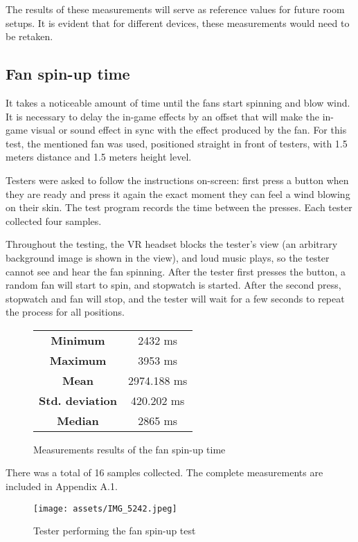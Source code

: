 The results of these measurements will serve as reference values for future
room setups. It is evident that for different devices, these measurements
would need to be retaken.


\hypertarget{x-fan-spin-up-time}{\subsection{Fan spin-up time}}
It takes a noticeable amount of time until the fans start spinning and
blow wind. It is necessary to delay the in-game effects by an offset that
will make the in-game visual or sound effect in sync with the effect
produced by the fan.
For this test, the mentioned fan was used, positioned straight in front of
testers, with 1.5 meters distance and 1.5 meters height level.


Testers were asked to follow the instructions on-screen: first press a button
when they are ready and press it again the exact moment they can feel a wind
blowing on their skin. The test program records the time between the presses.
Each tester collected four samples.

Throughout the testing, the VR headset blocks the tester’s view (an arbitrary
background image is shown in the view), and loud music plays, so the tester
cannot see and hear the fan spinning. After the tester first presses the button,
a random fan will start to spin, and stopwatch is started. After the second
press, stopwatch and fan will stop, and the tester will wait for a few seconds
to repeat the process for all positions.

\begin{figure}[H]
\centering
\begin{tabular}{|c|c|}
\hline
\textbf{Minimum} & 2432 ms \\ 
\textbf{Maximum} & 3953 ms \\ 
\textbf{Mean} & 2974.188 ms \\ 
\textbf{Std. deviation} & 420.202 ms \\ 
\textbf{Median} & 2865 ms \\ 
\hline
\end{tabular}
\caption{Measurements results of the fan spin-up time}
\end{figure}

There was a total of 16 samples collected. The complete measurements are included 
in Appendix A.1.

\begin{figure}[h]{}
\centering\texttt{[image: assets/IMG\_5242.jpeg]}
\caption{Tester performing the fan spin-up test}
\end{figure}

